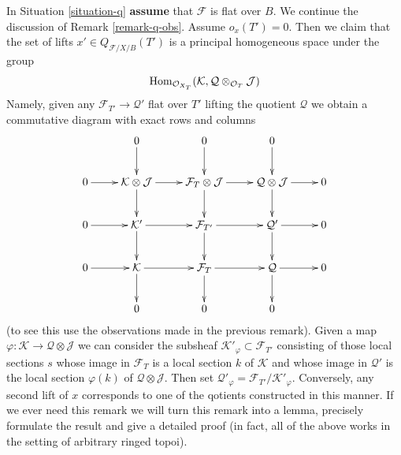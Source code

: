 \begin{remark}
\label{remark-q-defos}
In Situation \ref{situation-q} {\bf assume} that $\mathcal{F}$ is flat
over $B$. We continue the discussion of Remark \ref{remark-q-obs}.
Assume $o_x(T') = 0$. Then we claim that the set of lifts
$x' \in Q_{\mathcal{F}/X/B}(T')$ is a principal homogeneous space
under the group
$$
\mathop{\mathrm{Hom}}\nolimits_{\mathcal{O}_{X_T}}(\mathcal{K},
\mathcal{Q} \otimes_{\mathcal{O}_T} \mathcal{J})
$$
Namely, given any $\mathcal{F}_{T'} \to \mathcal{Q}'$ flat over $T'$
lifting the quotient $\mathcal{Q}$ we obtain a commutative diagram
with exact rows and columns
$$
\xymatrix{
& 0 \ar[d] & 0 \ar[d] & 0 \ar[d] \\
0 \ar[r] &
\mathcal{K} \otimes \mathcal{J} \ar[r] \ar[d] &
\mathcal{F}_T \otimes \mathcal{J} \ar[r] \ar[d] &
\mathcal{Q} \otimes \mathcal{J} \ar[r] \ar[d] &
0 \\
0 \ar[r] &
\mathcal{K}' \ar[r] \ar[d] &
\mathcal{F}_{T'} \ar[r] \ar[d] &
\mathcal{Q}' \ar[r] \ar[d] &
0 \\
0 \ar[r] &
\mathcal{K} \ar[d] \ar[r] &
\mathcal{F}_T \ar[d] \ar[r] &
\mathcal{Q} \ar[d] \ar[r] &
0 \\
& 0 & 0 & 0
}
$$
(to see this use the observations made in the previous remark).
Given a map $\varphi : \mathcal{K} \to \mathcal{Q} \otimes \mathcal{J}$
we can consider the subsheaf $\mathcal{K}'_\varphi \subset \mathcal{F}_{T'}$
consisting of those local sections $s$
whose image in $\mathcal{F}_T$ is a local section $k$ of $\mathcal{K}$
and whose image in $\mathcal{Q}'$ is the local section $\varphi(k)$ of
$\mathcal{Q} \otimes \mathcal{J}$. Then set
$\mathcal{Q}'_\varphi = \mathcal{F}_{T'}/\mathcal{K}'_\varphi$.
Conversely, any second lift of $x$ corresponds to one of the
qotients constructed in this manner. If we ever need this
remark we will turn this remark into a lemma, precisely formulate
the result and give a detailed proof (in fact, all of the above
works in the setting of arbitrary ringed topoi).
\end{remark}

